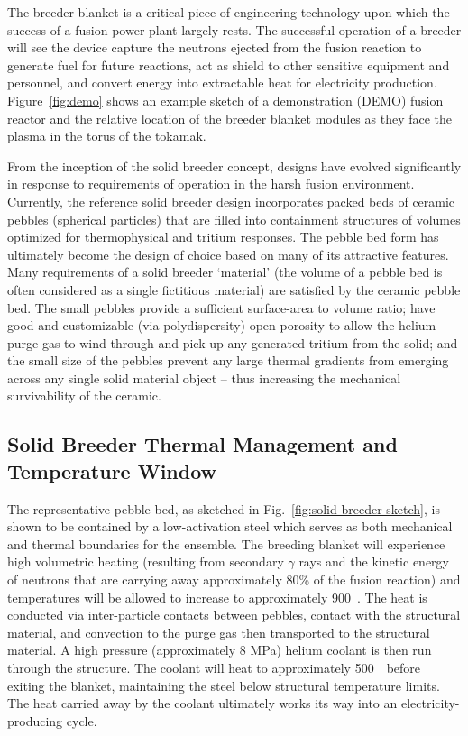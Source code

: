 The breeder blanket is a critical piece of engineering technology upon which the success of a fusion power plant largely rests. The successful operation of a breeder will see the device capture the neutrons ejected from the fusion reaction to generate fuel for future reactions, act as shield to other sensitive equipment and personnel, and convert energy into extractable heat for electricity production. Figure~\ref{fig:demo} shows an example sketch of a demonstration (DEMO) fusion reactor and the relative location of the breeder blanket modules as they face the plasma in the torus of the tokamak. 

From the inception of the solid breeder concept, designs have evolved significantly in response to requirements of operation in the harsh fusion environment. Currently, the reference solid breeder design incorporates packed beds of ceramic pebbles (spherical particles) that are filled into containment structures of volumes optimized for thermophysical and tritium responses. The pebble bed form has ultimately become the design of choice based on many of its attractive features. Many requirements of a solid breeder `material' (the volume of a pebble bed is often considered as a single fictitious material) are satisfied by the ceramic pebble bed. The small pebbles provide a sufficient surface-area to volume ratio; have good and customizable (via polydispersity) open-porosity to allow the helium purge gas to wind through and pick up any generated tritium from the solid; and the small size of the pebbles prevent any large thermal gradients from emerging across any single solid material object -- thus increasing the mechanical survivability of the ceramic. 

\subsection{Solid Breeder Thermal Management and Temperature Window}

The representative pebble bed, as sketched in Fig.~\ref{fig:solid-breeder-sketch}, is shown to be contained by a low-activation steel which serves as both mechanical and thermal boundaries for the ensemble. The breeding blanket will experience high volumetric heating (resulting from secondary $\gamma$ rays and the kinetic energy of neutrons that are carrying away approximately 80\% of the fusion reaction) and temperatures will be allowed to increase to approximately 900~\celsius. The heat is conducted via inter-particle contacts between pebbles, contact with the structural material, and convection to the purge gas then transported to the structural material. A high pressure (approximately 8 MPa) helium coolant is then run through the structure. The coolant will heat to approximately 500~\celsius~before exiting the blanket, maintaining the steel below structural temperature limits. The heat carried away by the coolant ultimately works its way into an electricity-producing cycle. 

